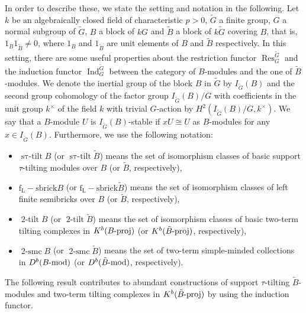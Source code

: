 \documentclass[pdftex,a4paper]{article}
\numberwithin{equation}{subsection}
\theoremstyle{definition}
\newcommand{\lmod}{\operatorname{\mathrm{\hspace{-2pt}-mod}}}
\newcommand{\lproj}{\operatorname{\mathrm{\hspace{-2pt}-proj}}}
\newcommand{\twotilt}{\operatorname{\mathrm{2-tilt}}}
\newcommand{\induc}{{\operatorname{Ind}\nolimits}}
\newcommand{\restr}{{\operatorname{Res}\nolimits}}
\newcommand{\stautilt}{\operatorname{\mathrm{s\tau-tilt}}}
\newcommand{\flsbrick}{\operatorname{\mathrm{f_L-sbrick}}}
\newcommand{\twosmc}{\operatorname{\mathrm{2-smc}}}
\newcommand{\inertiagp}{I}
\begin{document}
In order to describe these, we state the setting and notation in the following.
Let \(k\) be an algebraically closed field of characteristic \(p>0\), \(\tilde{G}\) a finite group, \(G\) a normal subgroup of \(\tilde{G}\), \(B\) a block of \(kG\) and \(\tilde{B}\) a block of \(k\tilde{G}\) covering \(B\), that is, \(1_B1_{\tilde{B}}\neq 0\), where \(1_B\) and \(1_{\tilde{B}}\) are unit elements of \(B\) and \(\tilde{B}\) respectively.
In this setting, there are some useful properties about the restriction functor \(\restr_G^{\tilde{G}}\) and the induction functor \(\induc_G^{\tilde{G}}\) between the category of \(B\)-modules and the one of \(\tilde{B}\)-modules.
We denote the inertial group of the block \(B\) in \({\tilde G}\) by \(\inertiagp_{\tilde G}(B)\)
and the second group cohomology of the factor group \(\inertiagp_{\tilde{G}}(B)/G\) with coefficients in the unit group \(k^\times\) of the field \(k\) with trivial \(G\)-action by \(H^2(\inertiagp_{\tilde{G}}(B)/G,k^\times)\).
We say that a \(B\)-module \(U\) is \(\inertiagp_{\tilde G}(B)\)-stable if \(xU \cong U\) as \(B\)-modules for any \(x\in \inertiagp_{\tilde G}(B)\).
Furthermore, we use the following notation:
\begin{itemize}
	\item \(\stautilt B\) (or \(\stautilt \tilde{B}\)) means the set of isomorphism classes of basic support \(\tau\)-tilting modules over \(B\) (or \(\tilde{B}\), respectively),
	\item \(\flsbrick B\) (or \(\flsbrick \tilde{B}\)) means the set of isomorphism classes of left finite semibricks over \(B\) (or \(\tilde{B}\), respectively),
	\item \(\twotilt B\) (or \(\twotilt \tilde{B}\)) means the set of isomorphism classes of basic two-term tilting complexes in \(K^b(B\lproj)\) (or \(K^b(\tilde{B}\lproj)\), respectively),
	\item \(\twosmc B\) (or \(\twosmc \tilde{B}\)) means the set of two-term simple-minded collections in \(D^b(B\lmod)\) (or \(D^b(\tilde{B}\lmod)\), respectively).
\end{itemize}
The following result contributes to abundant constructions of support \(\tau\)-tilting \(\tilde{B}\)-modules and two-term tilting complexes in \(K^b(\tilde{B}\lproj)\) by using the induction functor.
\end{document}
